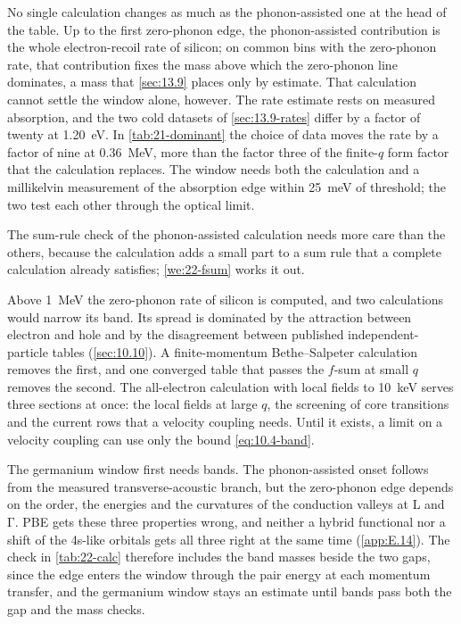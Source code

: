 No single calculation changes as much as the phonon-assisted one at the head of the table. Up to the first zero-phonon edge, the phonon-assisted contribution is the whole electron-recoil rate of silicon; on common bins with the zero-phonon rate, that contribution fixes the mass above which the zero-phonon line dominates, a mass that \cref{sec:13.9} places only by estimate. That calculation cannot settle the window alone, however. The rate estimate rests on measured absorption, and the two cold datasets of \cref{sec:13.9-rates} differ by a factor of twenty at \SI{1.20}{eV}. In \cref{tab:21-dominant} the choice of data moves the rate by a factor of nine at \SI{0.36}{MeV}, more than the factor three of the finite-$q$ form factor that the calculation replaces. The window needs both the calculation and a millikelvin measurement of the absorption edge within \SI{25}{meV} of threshold; the two test each other through the optical limit.

The sum-rule check of the phonon-assisted calculation needs more care than the others, because the calculation adds a small part to a sum rule that a complete calculation already satisfies; \cref{we:22-fsum} works it out.

Above \SI{1}{MeV} the zero-phonon rate of silicon is computed, and two calculations would narrow its band. Its spread is dominated by the attraction between electron and hole and by the disagreement between published independent-particle tables (\cref{sec:10.10}). A finite-momentum Bethe--Salpeter calculation removes the first, and one converged table that passes the $f$-sum at small $q$ removes the second. The all-electron calculation with local fields to \SI{10}{keV} serves three sections at once: the local fields at large $q$, the screening of core transitions and the current rows that a velocity coupling needs. Until it exists, a limit on a velocity coupling can use only the bound \cref{eq:10.4-band}.

The germanium window first needs bands. The phonon-assisted onset follows from the measured transverse-acoustic branch, but the zero-phonon edge depends on the order, the energies and the curvatures of the conduction valleys at L and $\mathrm{\Gamma}$. PBE gets these three properties wrong, and neither a hybrid functional nor a shift of the 4s-like orbitals gets all three right at the same time (\cref{app:E.14}). The check in \cref{tab:22-calc} therefore includes the band masses beside the two gaps, since the edge enters the window through the pair energy at each momentum transfer, and the germanium window stays an estimate until bands pass both the gap and the mass checks.

